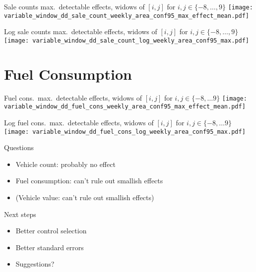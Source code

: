 \documentclass[aspectratio=169]{beamer}
\begin{document}

\begin{frame}{Sale counts max.\ detectable effects, widows of $[i, j]$ for $i,j \in \{-8, \ldots, 9\}$}
	\centering
	\texttt{[image: variable\_window\_dd\_sale\_count\_weekly\_area\_conf95\_max\_effect\_mean.pdf]}

\end{frame}

\begin{frame}{Log sale counts max.\ detectable effects, widows of $[i, j]$ for $i,j \in \{-8, \ldots, 9\}$}
	\centering
	\texttt{[image: variable\_window\_dd\_sale\_count\_log\_weekly\_area\_conf95\_max.pdf]}
\end{frame}

\section{Fuel Consumption}
\begin{frame}{Fuel cons.\ max.\ detectable effects, widows of $[i, j]$ for $i,j \in \{-8, \ldots 9\}$}
	\centering
	\texttt{[image: variable\_window\_dd\_fuel\_cons\_weekly\_area\_conf95\_max\_effect\_mean.pdf]}

\end{frame}

\begin{frame}{Log fuel cons.\ max.\ detectable effects, widows of $[i, j]$ for $i,j \in \{-8, \ldots 9\}$}
	\centering
	\texttt{[image: variable\_window\_dd\_fuel\_cons\_log\_weekly\_area\_conf95\_max.pdf]}
\end{frame}

\begin{frame}{Questions}
	\begin{itemize}
		\item Vehicle count: probably no effect
		\item Fuel consumption: can't rule out smallish effects
		\item (Vehicle value: can't rule out smallish effects)
	\end{itemize}

\end{frame}
\begin{frame}{Next steps}
	\begin{itemize}
		\item Better control selection
		\item Better standard errors
		\item Suggestions?
	\end{itemize}
\end{frame}
\end{document}
